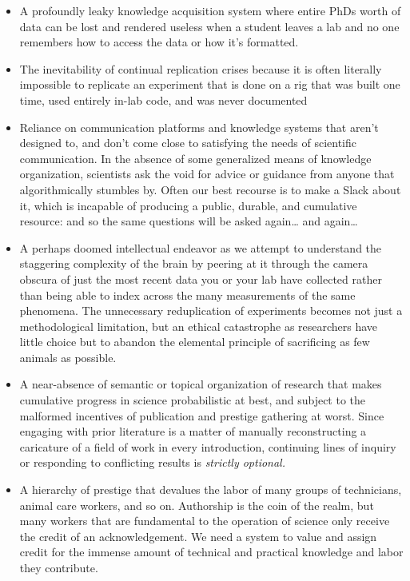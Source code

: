 \begin{itemize}

\item
  A profoundly leaky knowledge acquisition system where entire PhDs
  worth of data can be lost and rendered useless when a student leaves a
  lab and no one remembers how to access the data or how it's formatted.
\item
  The inevitability of continual replication crises because it is often
  literally impossible to replicate an experiment that is done on a rig
  that was built one time, used entirely in-lab code, and was never
  documented
\item
  Reliance on communication platforms and knowledge systems that aren't
  designed to, and don't come close to satisfying the needs of
  scientific communication. In the absence of some generalized means of
  knowledge organization, scientists ask the void
  for advice or guidance from anyone that algorithmically stumbles by.
  Often our best recourse is to make a Slack about it, which is
  incapable of producing a public, durable, and cumulative resource: and
  so the same questions will be asked again\ldots{} and again\ldots{}
\item
  A perhaps doomed intellectual endeavor as we attempt to understand the staggering
  complexity of the brain by peering at it through the camera obscura of
  just the most recent data you or your lab have collected rather than
  being able to index across the many measurements of the same
  phenomena. The unnecessary reduplication of experiments becomes not
  just a methodological limitation, but an ethical catastrophe as
  researchers have little choice but to abandon the elemental principle
  of sacrificing as few animals as possible.
\item
  A near-absence of semantic or topical organization of research that
  makes cumulative progress in science probabilistic at best, and subject
  to the malformed incentives of publication and prestige gathering at
  worst. Since engaging with prior literature is a matter of manually
  reconstructing a caricature of a field of work in every introduction,
  continuing lines of inquiry or responding to conflicting results is
  \emph{strictly optional.}
\item
  A hierarchy of prestige that devalues the labor of many groups of
  technicians, animal care workers, and so on. Authorship is the coin of
  the realm, but many workers that are fundamental to the operation of
  science only receive the credit of an acknowledgement. We need a
  system to value and assign credit for the immense amount of technical
  and practical knowledge and labor they contribute.
\end{itemize}

